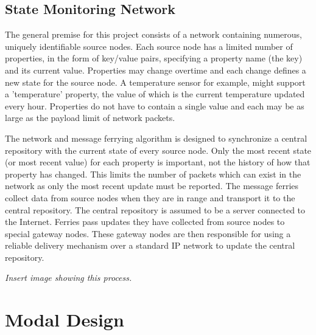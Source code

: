 \subsection{State Monitoring Network}

The general premise for this project consists of a network containing numerous, uniquely identifiable source nodes. 
Each source node has a limited number of properties, in the form of key/value pairs, specifying a property name (the key) and its current value.
Properties may change overtime and each change defines a new state for the source node.
A temperature sensor for example, might support a 'temperature' property, the value of which is the current temperature updated every hour.
Properties do not have to contain a single value and each may be as large as the payload limit of network packets. %

%




The network and message ferrying algorithm is designed to synchronize a central repository with the current state of every source node.
Only the most recent state (or most recent value) for each property is important, not the history of how that property has changed.
This limits the number of packets which can exist in the network as only the most recent update must be reported.
The message ferries collect data from source nodes when they are in range and transport it to the central repository.
The central repository is assumed to be a server connected to the Internet.
Ferries pass updates they have collected from source nodes to special gateway nodes.
These gateway nodes are then responsible for using a reliable delivery mechanism over a standard IP network to update the central repository.

\emph{Insert image showing this process.}

\section{Modal Design}
